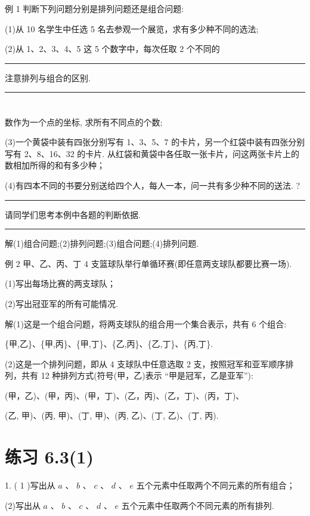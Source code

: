 \documentclass[10pt]{article}
\newcommand{\HRule}{\begin{center}\rule{0.9\linewidth}{0.2mm}\end{center}}
\begin{document}
例 1 判断下列问题分别是排列问题还是组合问题:

(1)从 10 名学生中任选 5 名去参观一个展览，求有多少种不同的选法;

(2)从 1、2、3、4、5 这 5 个数字中，每次任取 2 个不同的



\HRule

注意排列与组合的区别.

\HRule

\section*{}

数作为一个点的坐标, 求所有不同点的个数;

(3)一个黄袋中装有四张分别写有 1、3、5、7 的卡片，另一个红袋中装有四张分别写有 2、8、16、32 的卡片. 从红袋和黄袋中各任取一张卡片，问这两张卡片上的数相加所得的和有多少种；

(4)有四本不同的书要分别送给四个人，每人一本，问一共有多少种不同的送法. ?

\HRule

请同学们思考本例中各题的判断依据.

\HRule

解(1)组合问题;(2)排列问题;(3)组合问题;(4)排列问题.

例 2 甲、乙、丙、丁 4 支篮球队举行单循环赛(即任意两支球队都要比赛一场).

(1)写出每场比赛的两支球队；

(2)写出冠亚军的所有可能情况.

解(1)这是一个组合问题，将两支球队的组合用一个集合表示，共有 6 个组合:

\{甲,乙\}、\{甲,丙\}、\{甲,丁\}、\{乙,丙\}、\{乙,丁\}、\{丙,丁\}.

(2)这是一个排列问题，即从 4 支球队中任意选取 2 支，按照冠军和亚军顺序排列，共有 12 种排列方式(符号(甲，乙)表示 “甲是冠军，乙是亚军”):

(甲，乙)、(甲，丙)、(甲，丁)、(乙，丙)、(乙，丁)、(丙，丁)、

(乙, 甲)、(丙, 甲)、(丁, 甲)、(丙, 乙)、(丁, 乙)、(丁, 丙).

\section*{练习 6.3(1)}

1. ( 1 )写出从 \(a\text{ 、 }b\text{ 、 }c\text{ 、 }d\text{ 、 }e\) 五个元素中任取两个不同元素的所有组合；

(2)写出从 \(a\text{ 、 }b\text{ 、 }c\text{ 、 }d\text{ 、 }e\) 五个元素中任取两个不同元素的所有排列.
\end{document}
